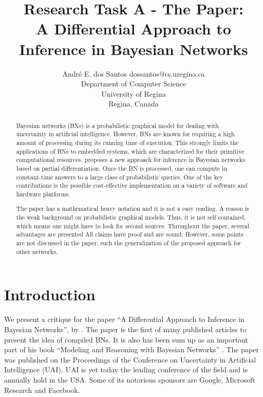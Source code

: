 \documentclass[twoside,11pt]{article}
\begin{document}
\title{Research Task A - The Paper: \\ A Differential Approach to Inference in Bayesian Networks}

\author{\name Andr\'e E. dos Santos \email dossantos@cs.uregina.ca \\
\addr Department of Computer Science \\
University of Regina \\ 
Regina, Canada
}



\maketitle

\begin{abstract}%
Bayesian networks (BNs) is a probabilistic graphical model for dealing with uncertainty in artificial intelligence.
However, BNs are known for requiring a high amount of processing during its running time of execution.
This strongly limits the applications of BNs to embedded systems, which are characterized for their primitive computational resources. 
\cite{darwiche00} proposes a new approach for inference in Bayesian networks based on partial differentiation.
Once the BN is processed, one can compute in constant-time answers to a large class of probabilistic queries.
One of the key contributions is the possible cost-effective implementation on a variety of software and hardware platforms.

The paper has a mathematical heavy notation and it is not a easy reading.
A reason is the weak background on probabilistic graphical models.
Thus, it is not self contained, which means one might have to look for second sources.
Throughout the paper, several advantages are presented
All claims have proof and are sound.
However, some points are not discussed in the paper, such the generalization of the proposed approach for other networks.
\end{abstract}


\section{Introduction}
\label{sec:intro}


We present a critique for the paper ``A Differential Approach to Inference in Bayesian Networks'', by \cite{darwiche00}.
The paper is the first of many published articles to present the idea of compiled BNs\citep{darwiche2003differential,chavira2006compiling,park2004differential,chavira2007compiling}. 
It is also has been sum up as an important part of his book ``Modeling and Reasoning with Bayesian Networks'' \citeyearpar{darwiche2009modeling}.
The paper was published on the Proceedings of the Conference on Uncertainty in Artificial Intelligence (UAI).
UAI is yet today the leading conference of the field and is annually hold in the USA.
Some of its notorious sponsors are Google, Microsoft Research and Facebook.
\end{document}
